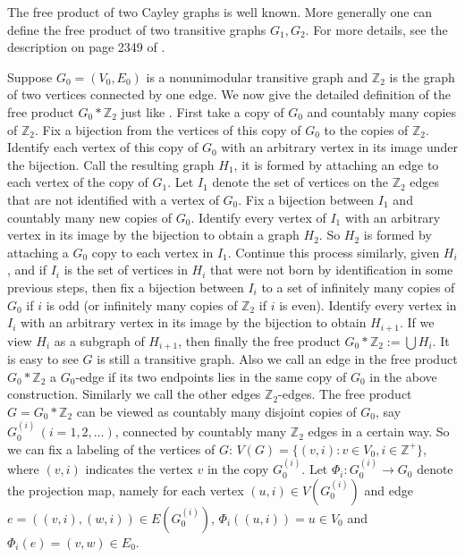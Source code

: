 \documentclass[12pt]{article}
\numberwithin{equation}{section}
\newcommand{\1}{\mathbf{1}}
\begin{document}
The free product of two Cayley graphs is well known. More generally one can define the free product of two transitive graphs $G_1,G_2$. For more details, see the description on page 2349 of \cite{Timar2006}. 

Suppose $G_0=(V_0,E_0)$ is a nonunimodular transitive graph and $\mathbb{Z}_2$ is the graph of two vertices connected by one edge. We now give the detailed definition of the free product $G_0*\mathbb{Z}_2$ just like \cite{Timar2006}. First take a copy of $G_0$ and countably many copies of $\mathbb{Z}_2$. Fix a bijection from the vertices of this copy of $G_0$ to the copies of $\mathbb{Z}_2$. Identify each vertex of this copy of $G_0$ with an arbitrary vertex in its image under the bijection. Call the resulting graph $H_1$, it is  formed by attaching an edge to each vertex of the copy of $G_1$. Let $I_1$ denote the set of  vertices on the  $\mathbb{Z}_2$ edges that are not identified with a vertex of $G_0$. Fix a bijection between $I_1$ and countably many new copies of $G_0$. Identify every vertex of $I_1$ with an arbitrary vertex in its image by the bijection to obtain a graph $H_2$. So $H_2$ is formed by attaching a $G_0$ copy to each vertex in $I_1$. 
Continue this process similarly, given $H_i$, and if $I_i$ is the set of vertices in $H_i$ that were not born by identification in some previous steps, then fix a bijection between $I_i$ to a set of infinitely many copies of $G_0$ if $i$ is odd  (or infinitely many copies of $\mathbb{Z}_2$
if $i$ is even). Identify every vertex in $I_i$ with an arbitrary vertex in  its image by the bijection to obtain $H_{i+1}$. If we view $H_i$ as a subgraph of $H_{i+1}$, then finally the free product $G_0*\mathbb{Z}_2:=\bigcup H_i$. It is easy to see $G$ is still a transitive graph. 
Also we call an edge in the free product $G_0*\mathbb{Z}_2$ a $G_0$-edge if its two endpoints lies in the same copy of $G_0$ in the above construction. Similarly we call the other edges  $\mathbb{Z}_2$-edges. The free product $G=G_0*\mathbb{Z}_2$ can be viewed as countably many disjoint copies of $G_0$, say $G_0^{(i)}\,(i=1,2,\ldots)$, connected by countably many $\mathbb{Z}_2$ edges in a certain way. So we can fix a labeling of the vertices of $G$: $V(G)=\{(v,i)\colon v\in V_0,i\in\mathbb{Z}^+\}$, where $(v,i)$ indicates  the vertex $v$ in the copy $G_0^{(i)}$. Let $\Phi_i: G_0^{(i)}\rightarrow G_0$ denote the projection map, namely for each vertex $(u,i)\in V(G_0^{(i)})$ and edge $e=((v,i),(w,i))\in E(G_0^{(i)})$, $\Phi_i((u,i))=u\in V_0$ and $\Phi_i(e)=(v,w)\in E_0$.
\end{document}
